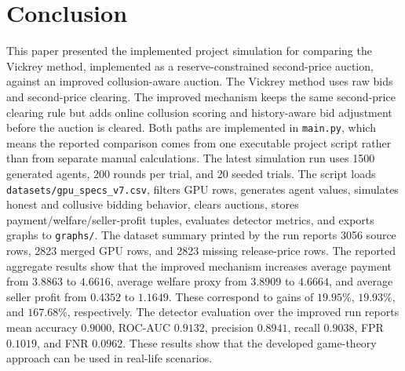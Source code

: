 \documentclass[conference]{IEEEtran}
\begin{document}
\section{Conclusion}
This paper presented the implemented project simulation for comparing the Vickrey method, implemented as a reserve-constrained second-price auction, against an improved collusion-aware auction. The Vickrey method uses raw bids and second-price clearing. The improved mechanism keeps the same second-price clearing rule but adds online collusion scoring and history-aware bid adjustment before the auction is cleared. Both paths are implemented in \texttt{main.py}, which means the reported comparison comes from one executable project script rather than from separate manual calculations.
The latest simulation run uses 1500 generated agents, 200 rounds per trial, and 20 seeded trials. The script loads \texttt{datasets/gpu\_specs\_v7.csv}, filters GPU rows, generates agent values, simulates honest and collusive bidding behavior, clears auctions, stores payment/welfare/seller-profit tuples, evaluates detector metrics, and exports graphs to \texttt{graphs/}. The dataset summary printed by the run reports 3056 source rows, 2823 merged GPU rows, and 2823 missing release-price rows.
The reported aggregate results show that the improved mechanism increases average payment from $3.8863$ to $4.6616$, average welfare proxy from $3.8909$ to $4.6664$, and average seller profit from $0.4352$ to $1.1649$. These correspond to gains of $19.95\%$, $19.93\%$, and $167.68\%$, respectively. The detector evaluation over the improved run reports mean accuracy $0.9000$, ROC-AUC $0.9132$, precision $0.8941$, recall $0.9038$, FPR $0.1019$, and FNR $0.0962$.
These results show that the developed game-theory approach can be used in real-life scenarios. 
\end{document}
